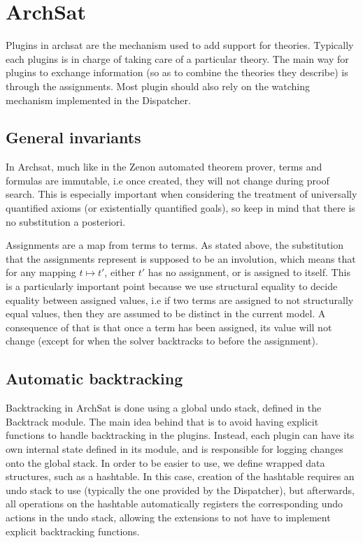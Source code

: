 
\section{ArchSat}

Plugins in archsat are the mechanism used to add support for theories.
Typically each plugins is in charge of taking care of a particular theory.
The main way for plugins to exchange information (so as to combine
the theories they describe) is through the assignments. Most plugin should
also rely on the watching mechanism implemented in the Dispatcher.

\subsection{General invariants}

In Archsat, much like in the Zenon automated theorem prover, terms and formulas
are immutable, i.e once created, they will not change during proof search.
This is especially important when considering the treatment of universally
quantified axioms (or existentially quantified goals), so keep in mind that
there is no substitution a posteriori.

Assignments are a map from terms to terms. As stated above, the
substitution that the assignments represent is supposed to be an involution,
which means that for any mapping $t \mapsto t'$, either $t'$ has no assignment,
or is assigned to itself. This is a particularly important
point because we use structural equality to decide equality between assigned
values, i.e if two terms are assigned to not structurally equal values, then
they are assumed to be distinct in the current model.
A consequence of that is that once a term has been assigned, its value will
not change (except for when the solver backtracks to before the assignment).

\subsection{Automatic backtracking}

Backtracking in ArchSat is done using a global undo stack, defined in the
Backtrack module. The main idea behind that is to avoid having explicit
functions to handle backtracking in the plugins. Instead, each plugin
can have its own internal state defined in its module, and is responsible for
logging changes onto the global stack. In order to be easier to use,
we define wrapped data structures, such as a hashtable. In this case, creation
of the hashtable requires an undo stack to use (typically the one provided by
the Dispatcher), but afterwards, all operations
on the hashtable automatically registers the corresponding undo actions in
the undo stack, allowing the extensions to not have to implement explicit
backtracking functions.

